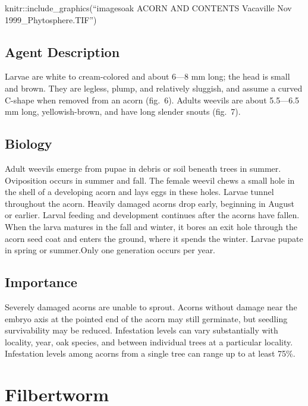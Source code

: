 \documentclass[
]{book}
\begin{document}
knitr::include\_graphics(``images\Valley oak ACORN AND CONTENTS Vacaville Nov 1999\_Phytosphere.TIF'')

\subsection*{Agent Description}\label{agent-description}

Larvae are white to cream-colored and about 6---8 mm long; the head is small and brown. They are legless, plump, and relatively sluggish, and assume a curved C-shape when removed from an acorn (fig.~6). Adults weevils are about 5.5---6.5 mm long, yellowish-brown, and have long slender snouts (fig.~7).

\subsection*{Biology}\label{biology}

Adult weevils emerge from pupae in debris or soil beneath trees in summer. Oviposition occurs in summer and fall. The female weevil chews a small hole in the shell of a developing acorn and lays eggs in these holes. Larvae tunnel throughout the acorn. Heavily damaged acorns drop early, beginning in August or earlier. Larval feeding and development continues after the acorns have fallen. When the larva matures in the fall and winter, it bores an exit hole through the acorn seed coat and enters the ground, where it spends the winter. Larvae pupate in spring or summer.Only one generation occurs per year.

\subsection*{Importance}\label{importance}

Severely damaged acorns are unable to sprout. Acorns without damage near the embryo axis at the pointed end of the acorn may still germinate, but seedling survivability may be reduced. Infestation levels can vary substantially with locality, year, oak species, and between individual trees at a particular locality. Infestation levels among acorns from a single tree can range up to at least 75\%.

\section*{Filbertworm}\label{filbertworm}
\end{document}
